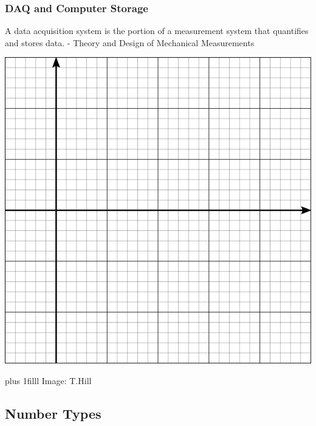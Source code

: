 \documentclass[fleqn]{beamer} %
\newcommand{\sectionIsubsectionItitle}{DAQ and Computer Storage}
\newcommand{\sectionIsubsectionIItitle}{Number Types}
\newcommand{\btVFill}{\vskip0pt plus 1filll}
\begin{document}
			\begin{frame}
				\frametitle{\sectionIsubsectionItitle}

				A data acquisition system is the portion of a measurement system that quantifies and stores data. - {\tiny Theory and Design of Mechanical Measurements}

				\begin{multicols}{2}
				\includegraphics[scale=.30]{images/cartesian_6x6_B.png} 
				

				\end{multicols}
				\btVFill
				\tiny{Image: T.Hill}
	
			\end{frame}

		\subsection{\sectionIsubsectionIItitle}\label{sectionIsubsectionII}
\end{document}
